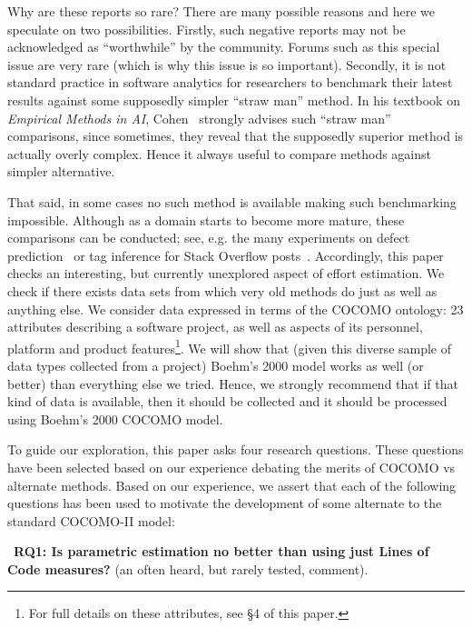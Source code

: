 \documentclass[smallcondesed]{svjour3}
\newenvironment{BLUE}{\color{black}}{\ignorespacesafterend}
\newcommand{\HERE}[1]{}
\begin{document}
Why are these reports so rare? There are many possible reasons and here we speculate on two possibilities.
Firstly, such negative reports may not be acknowledged as ``worthwhile'' by the community. Forums such
as this special issue are very rare (which is why this issue is so important).
Secondly, it is not standard practice in software analytics for researchers to benchmark their latest
results against some supposedly simpler ``straw man'' method. In his textbook on {\em Empirical Methods in AI}, Cohen~\cite{cohen95} strongly advises such ``straw man'' comparisons, since sometimes, they reveal that the supposedly
superior method is actually overly complex. Hence it
always useful  to compare methods
against simpler alternative. 

\begin{BLUE}\HERE{Reviewer1b} That said,
in some  cases no such method is available making such  benchmarking impossible. Although as a   domain starts to become more mature,
these comparisons can be conducted; see, e.g. the
many experiments on defect prediction~\cite{Scanniello2013} or tag inference for Stack Overflow posts~\cite{stanley2013predicting}.
\end{BLUE}
Accordingly, this paper checks an interesting,
but currently unexplored aspect of effort estimation.
We check
if there exists data sets from which  very old methods do just as well as anything else. 
We consider data expressed in terms of the COCOMO ontology: 23 attributes describing
a software project,  as well as aspects of its personnel, platform and product features\footnote{For full details on these attributes, see {\S}4 of this paper.}. We will show
that (given this diverse sample of data types collected from a project)   Boehm's 2000 model works
as well (or better) than everything else we tried.  Hence, we strongly recommend that if that kind
of data is available, then it should be collected and it should be processed using Boehm's 2000 COCOMO model.


To guide our exploration,
 this paper asks four research questions.  These
 questions have been selected based  on our experience debating
 the merits of COCOMO vs alternate methods. Based on our experience,
 we assert that each of the following questions has been used to motivate
 the development of some alternate to the standard COCOMO-II model:


~{\bf RQ1: Is parametric estimation no better than
   using just Lines of Code measures?} 
  (an   often heard, but rarely tested, comment).
\end{document}
